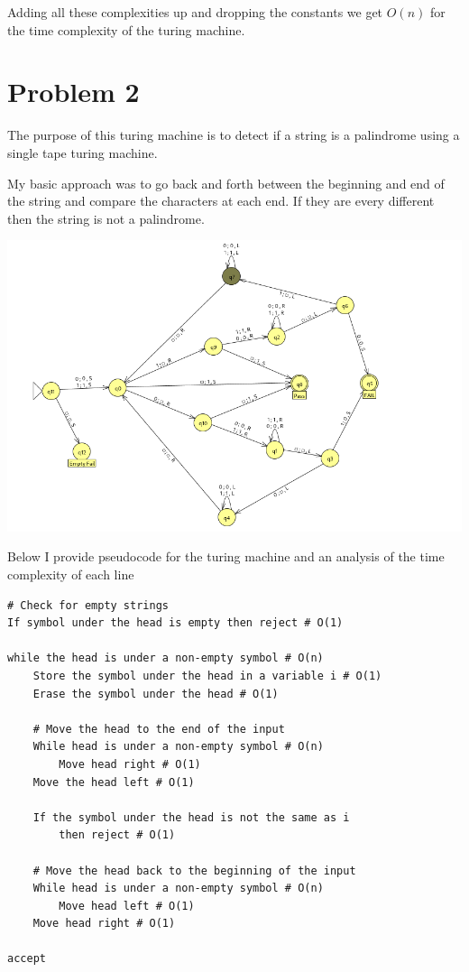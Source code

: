 \documentclass[12pt]{article}
\begin{document}
Adding all these complexities up and dropping the constants we get $O(n)$ for the time complexity of the turing machine.


\section{Problem 2}
The purpose of this turing machine is to detect if a string is a palindrome using a single tape turing machine.

My basic approach was to go back and forth between the beginning and end of the string and compare the characters at each end. If they are every different then the string is not a palindrome.

\includegraphics[width=\textwidth]{problem2.png}

Below I provide pseudocode for the turing machine and an analysis of the time complexity of each line

\begin{lstlisting}[basicstyle=\small, tabsize=2]
# Check for empty strings
If symbol under the head is empty then reject # O(1)

while the head is under a non-empty symbol # O(n)
	Store the symbol under the head in a variable i # O(1)
	Erase the symbol under the head # O(1)

	# Move the head to the end of the input
	While head is under a non-empty symbol # O(n)
		Move head right # O(1)
	Move the head left # O(1)

	If the symbol under the head is not the same as i
		then reject # O(1)

	# Move the head back to the beginning of the input
	While head is under a non-empty symbol # O(n)
		Move head left # O(1)
	Move head right # O(1)

accept
\end{lstlisting}
\end{document}
